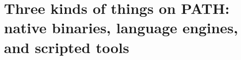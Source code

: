 \chapter{Three kinds of things on PATH: native binaries, language engines, and scripted tools}
\label{ch:three-kinds-of-things-on-path-native}

